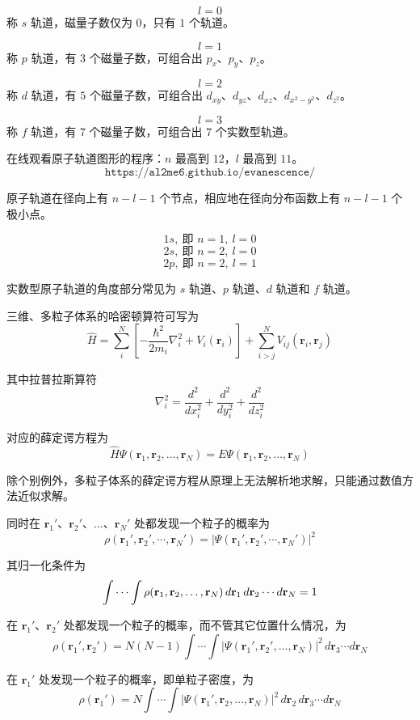 \[
l=0
\]
称 $s$ 轨道，磁量子数仅为 $0$，只有 $1$ 个轨道。

\[
l=1
\]
称 $p$ 轨道，有 $3$ 个磁量子数，可组合出 $p_x$、$p_y$、$p_z$。

\[
l=2
\]
称 $d$ 轨道，有 $5$ 个磁量子数，可组合出 $d_{xy}$、$d_{yz}$、$d_{xz}$、$d_{x^2-y^2}$、$d_{z^2}$。

\[
l=3
\]
称 $f$ 轨道，有 $7$ 个磁量子数，可组合出 $7$ 个实数型轨道。

在线观看原子轨道图形的程序：$n$ 最高到 $12$，$l$ 最高到 $11$。
\[
\texttt{https://al2me6.github.io/evanescence/}
\]

原子轨道在径向上有 $n-l-1$ 个节点，相应地在径向分布函数上有 $n-l-1$ 个极小点。

\[
1s,\ \text{即 } n=1,\ l=0
\]
\[
2s,\ \text{即 } n=2,\ l=0
\]
\[
2p,\ \text{即 } n=2,\ l=1
\]

实数型原子轨道的角度部分常见为 $s$ 轨道、$p$ 轨道、$d$ 轨道和 $f$ 轨道。

三维、多粒子体系的哈密顿算符可写为
\[
\hat H
=
\sum_i^N\left[-\frac{\hbar^2}{2m_i}\nabla_i^2+V_i(\mathbf r_i)\right]
+
\sum_{i>j}^N V_{ij}(\mathbf r_i,\mathbf r_j)
\]

其中拉普拉斯算符
\[
\nabla_i^2=\frac{d^2}{dx_i^2}+\frac{d^2}{dy_i^2}+\frac{d^2}{dz_i^2}
\]

对应的薛定谔方程为
\[
\hat H\Psi(\mathbf r_1,\mathbf r_2,\ldots,\mathbf r_N)
=
E\Psi(\mathbf r_1,\mathbf r_2,\ldots,\mathbf r_N)
\]

除个别例外，多粒子体系的薛定谔方程从原理上无法解析地求解，只能通过数值方法近似求解。

同时在 $\mathbf r_1'$、$\mathbf r_2'$、$\ldots$、$\mathbf r_N'$ 处都发现一个粒子的概率为
\[
\rho(\mathbf r_1',\mathbf r_2',\cdots,\mathbf r_N')
=
\left|\Psi(\mathbf r_1',\mathbf r_2',\cdots,\mathbf r_N')\right|^2
\]

其归一化条件为
\[
\idotsint \rho(\mathbf r_1,\mathbf r_2,\ldots,\mathbf r_N)\,d\mathbf r_1\,d\mathbf r_2\cdots d\mathbf r_N=1
\]

在 $\mathbf r_1'$、$\mathbf r_2'$ 处都发现一个粒子的概率，而不管其它位置什么情况，为
\[
\rho(\mathbf r_1',\mathbf r_2')
=
N(N-1)\int\cdots\int
\left|\Psi(\mathbf r_1',\mathbf r_2',\ldots,\mathbf r_N)\right|^2
\,d\mathbf r_3\cdots d\mathbf r_N
\]

在 $\mathbf r_1'$ 处发现一个粒子的概率，即单粒子密度，为
\[
\rho(\mathbf r_1')
=
N\int\cdots\int
\left|\Psi(\mathbf r_1',\mathbf r_2,\ldots,\mathbf r_N)\right|^2
\,d\mathbf r_2\,d\mathbf r_3\cdots d\mathbf r_N
\]

